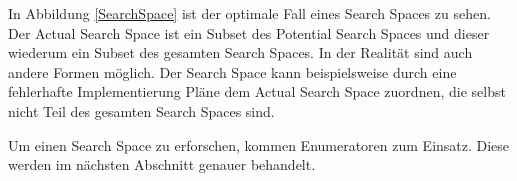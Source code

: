 In Abbildung \ref{SearchSpace} ist der optimale Fall eines Search Spaces zu sehen. Der Actual Search Space ist ein Subset des Potential Search Spaces und dieser wiederum ein Subset des gesamten Search Spaces. In der Realität sind auch andere Formen möglich. Der Search Space kann beispielsweise durch eine fehlerhafte Implementierung Pläne dem Actual Search Space zuordnen, die selbst nicht Teil des gesamten Search Spaces sind.

Um einen Search Space zu erforschen,  kommen Enumeratoren zum Einsatz. Diese werden im nächsten Abschnitt genauer behandelt.